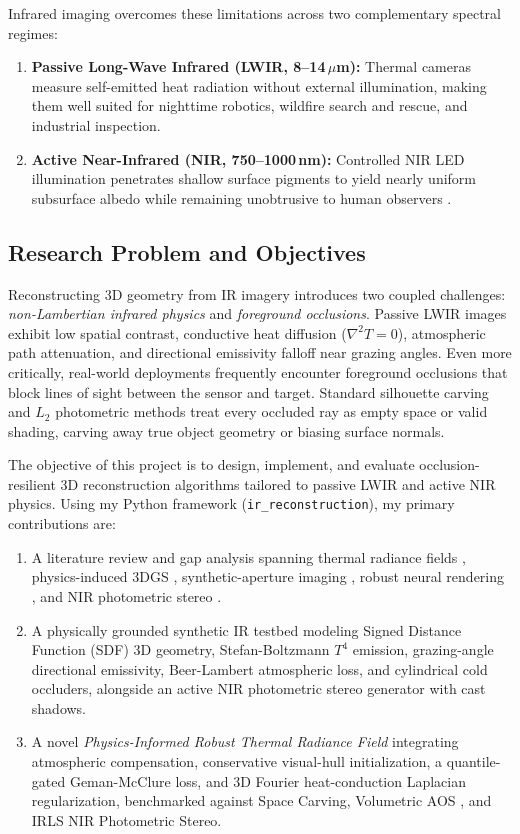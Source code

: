 \documentclass[12pt,letterpaper]{article}
\begin{document}
Infrared imaging overcomes these limitations across two complementary spectral regimes:
\begin{enumerate}
  \item \textbf{Passive Long-Wave Infrared (LWIR, 8--14\,$\mu$m):} Thermal cameras measure self-emitted heat radiation without external illumination, making them well suited for nighttime robotics, wildfire search and rescue, and industrial inspection.
  \item \textbf{Active Near-Infrared (NIR, 750--1000\,nm):} Controlled NIR LED illumination penetrates shallow surface pigments to yield nearly uniform subsurface albedo while remaining unobtrusive to human observers \cite{hansen2010nir}.
\end{enumerate}

\subsection{Research Problem and Objectives}
Reconstructing 3D geometry from IR imagery introduces two coupled challenges: \emph{non-Lambertian infrared physics} and \emph{foreground occlusions}. Passive LWIR images exhibit low spatial contrast, conductive heat diffusion ($\nabla^2 T = 0$), atmospheric path attenuation, and directional emissivity falloff near grazing angles. Even more critically, real-world deployments frequently encounter foreground occlusions that block lines of sight between the sensor and target. Standard silhouette carving and $L_2$ photometric methods treat every occluded ray as empty space or valid shading, carving away true object geometry or biasing surface normals.

The objective of this project is to design, implement, and evaluate occlusion-resilient 3D reconstruction algorithms tailored to passive LWIR and active NIR physics. Using my Python framework (\texttt{ir\_reconstruction}), my primary contributions are:
\begin{enumerate}
  \item A literature review and gap analysis spanning thermal radiance fields \cite{ye2024thermalnerf,lin2024thermalnerf,hassan2025thermonerf,zhu2023xnerf}, physics-induced 3DGS \cite{chen2024thermal3dgs,lu2024thermalgaussian}, synthetic-aperture imaging \cite{schedl2020search}, robust neural rendering \cite{sabour2023robustnerf,wu2025amodal3r}, and NIR photometric stereo \cite{hansen2010nir}.
  \item A physically grounded synthetic IR testbed modeling Signed Distance Function (SDF) 3D geometry, Stefan-Boltzmann $T^4$ emission, grazing-angle directional emissivity, Beer-Lambert atmospheric loss, and cylindrical cold occluders, alongside an active NIR photometric stereo generator with cast shadows.
  \item A novel \emph{Physics-Informed Robust Thermal Radiance Field} integrating atmospheric compensation, conservative visual-hull initialization, a quantile-gated Geman-McClure loss, and 3D Fourier heat-conduction Laplacian regularization, benchmarked against Space Carving, Volumetric AOS \cite{schedl2020search}, and IRLS NIR Photometric Stereo.
\end{enumerate}
\end{document}
